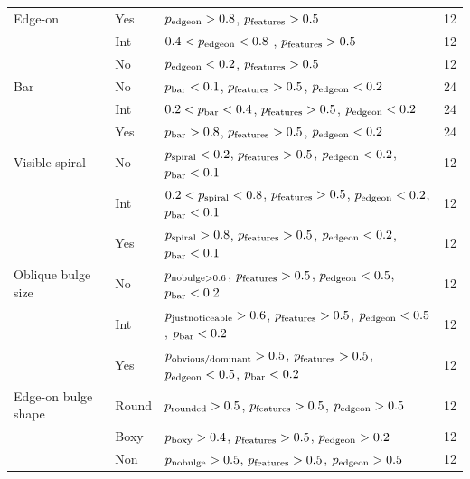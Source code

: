 \documentclass[usenatbib]{mn2e}
\begin{document}
\begin{table}
\begin{tabular}{lllc}
Edge-on             & Yes   & $p_{\rm edgeon} > 0.8$, $p_{\rm features} > 0.5$                                                      & 12 \\
                    & Int   & $0.4 < p_{\rm edgeon} < 0.8$ , $p_{\rm features} > 0.5$                                               & 12 \\
                    & No    & $p_{\rm edgeon} < 0.2$, $p_{\rm features} > 0.5$                                                      & 12 \\
Bar                 & No    & $p_{\rm bar} < 0.1$, $p_{\rm features} > 0.5$, $p_{\rm edgeon} < 0.2$                                 & 24 \\
                    & Int   & $0.2 < p_{\rm bar} < 0.4$, $p_{\rm features} > 0.5$, $p_{\rm edgeon} < 0.2$                           & 24 \\
                    & Yes   & $p_{\rm bar} > 0.8$, $p_{\rm features} > 0.5$, $p_{\rm edgeon} < 0.2$                                 & 24 \\
Visible spiral      & No    & $p_{\rm spiral} < 0.2$, $p_{\rm features} > 0.5$, $p_{\rm edgeon} < 0.2$, $p_{\rm bar} < 0.1$         & 12 \\
                    & Int   & $0.2 < p_{\rm spiral} < 0.8$, $p_{\rm features} > 0.5$, $p_{\rm edgeon} < 0.2$, $p_{\rm bar} < 0.1$   & 12 \\
                    & Yes   & $p_{\rm spiral} > 0.8$, $p_{\rm features} > 0.5$, $p_{\rm edgeon} < 0.2$, $p_{\rm bar} < 0.1$         & 12 \\
Oblique bulge size  & No    & $p_{\rm nobulge>0.6}$, $p_{\rm features} > 0.5$, $p_{\rm edgeon} < 0.5$, $p_{\rm bar} < 0.2$          & 12 \\
                    & Int   & $p_{\rm justnoticeable}>0.6$, $p_{\rm features} > 0.5$, $p_{\rm edgeon} < 0.5$, $p_{\rm bar} < 0.2$   & 12 \\
                    & Yes   & $p_{\rm obvious/dominant}>0.5$, $p_{\rm features} > 0.5$, $p_{\rm edgeon} < 0.5$, $p_{\rm bar} < 0.2$ & 12 \\
Edge-on bulge shape & Round & $p_{\rm rounded}>0.5$, $p_{\rm features} > 0.5$, $p_{\rm edgeon} > 0.5$                               & 12 \\
                    & Boxy  & $p_{\rm boxy}>0.4$, $p_{\rm features} > 0.5$, $p_{\rm edgeon} > 0.2$                                  & 12 \\
                    & Non   & $p_{\rm nobulge}>0.5$, $p_{\rm features} > 0.5$, $p_{\rm edgeon} > 0.5$                               & 12 \\
\hline\hline
\end{tabular}
\end{table}
\end{document}
